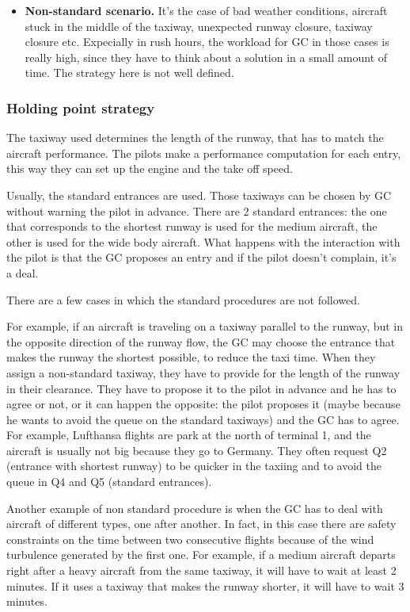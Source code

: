 \documentclass{article}
\begin{document}
\begin{itemize}
	\item \textbf{Non-standard scenario.} It's the case of bad weather conditions, aircraft stuck in the middle of the taxiway, unexpected runway closure, taxiway closure etc. Expecially in rush hours, the workload for GC in those cases is really high, since they have to think about a solution in a small amount of time. The strategy here is not well defined.
\end{itemize}

\subsubsection{Holding point strategy}
The taxiway used determines the length of the runway, that has to match the aircraft performance. The pilots make a performance computation for each entry, this way they can set up the engine and the take off speed. 

Usually, the standard entrances are used. Those taxiways can be chosen by GC without warning the pilot in advance. There are 2 standard entrances: the one that corresponds to the shortest runway is used for the medium aircraft, the other is used for the wide body aircraft. What happens with the interaction with the pilot is that the GC proposes an entry and if the pilot doesn't complain, it's a deal.

There are a few cases in which the standard procedures are not followed. 

For example, if an aircraft is traveling on a taxiway parallel to the runway, but in the opposite direction of the runway flow, the GC may choose the entrance that makes the runway the shortest possible, to reduce the taxi time. When they assign a non-standard taxiway, they have to provide for the length of the runway in their clearance. They have to propose it to the pilot in advance and he has to agree or not, or it can happen the opposite: the pilot proposes it (maybe because he wants to avoid the queue on the standard taxiways) and the GC has to agree. For example, Lufthansa flights are park at the north of terminal 1, and the aircraft is usually not big because they go to Germany. They often request Q2 (entrance with shortest runway) to be quicker in the taxiing and to avoid the queue in Q4 and Q5 (standard entrances).

Another example of non standard procedure is when the GC has to deal with aircraft of different types, one after another. In fact, in this case there are safety constraints on the time between two consecutive flights because of the wind turbulence generated by the first one. For example, if a medium aircraft departs right after a heavy aircraft from the same taxiway, it will have to wait at least 2 minutes. If it uses a taxiway that makes the runway shorter, it will have to wait 3 minutes.
\end{document}
